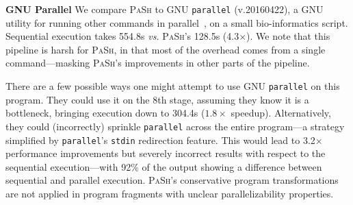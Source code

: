\documentclass[sigplan, review, screen, anonymous]{acmart}
\newcommand{\vs}{{\em vs.} }
\newcommand{\heading}[1]{\vspace{4pt}\noindent\textbf{#1}\enspace}
\newcommand{\ttt}[1]{\texttt{#1}}
\newcommand{\kk}[1]{[{\color{magenta}kk: #1}]}
\newcommand{\sys}{{\scshape PaSh}\xspace}
\begin{document}

\heading{GNU Parallel}
We compare \sys to GNU \ttt{parallel} (v.20160422), a GNU utility for running other commands in parallel~\cite{Tange2011a}, on a small bio-informatics script.
Sequential execution takes 554.8s \vs \sys's 128.5s (4.3$\times$).
We note that this pipeline is harsh for \sys, in that most of the overhead comes from a single command---masking \sys's improvements in other parts of the pipeline.


There are a few possible ways one might attempt to use GNU \ttt{parallel} on this program.
They could use it on the 8th stage, assuming they know it is a bottleneck, bringing execution down to 304.4s ($1.8\times$ speedup).
Alternatively, they could (incorrectly) sprinkle \ttt{parallel} across the entire program---a strategy simplified by \ttt{parallel}'s \ttt{stdin} redirection feature.
This would lead to 3.2$\times$ performance improvements but severely incorrect results with respect to the sequential execution---with 92\% of the output showing a difference between sequential and parallel execution.
\sys's conservative program transformations are not applied in program fragments with unclear parallelizability properties.


\end{document}
